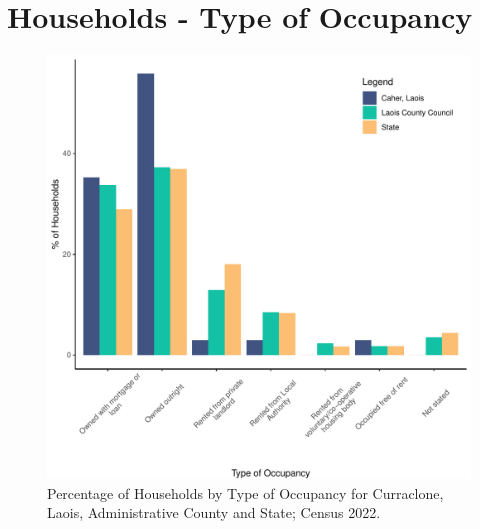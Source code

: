 \documentclass{article}
\begin{document}
\section{Households - Type of Occupancy}\label{sect:Households}
\begin{figure}[H]
	\centering
	\includegraphics[width = 140mm]{../figures/HouseholdsED.pdf}
	\caption{Percentage of Households by Type of Occupancy for Curraclone, Laois, Administrative County and State; Census 2022.}
	\label{fig:vbnv}
	\end{figure}
\end{document}

